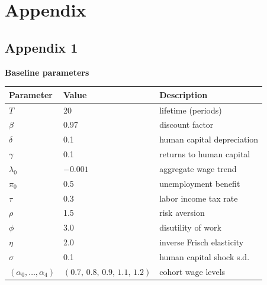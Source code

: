 \section{Appendix}

\subsection{Appendix 1}

\noindent\textbf{Baseline parameters}

\medskip
\begin{center}
\small
\begin{tabular}{llp{6.5cm}}
\toprule
Parameter & Value & Description \\
\midrule
$T$           & 20       & lifetime (periods) \\
$\beta$       & 0.97     & discount factor \\
$\delta$      & 0.1      & human capital depreciation \\
$\gamma$      & 0.1      & returns to human capital \\
$\lambda_0$   & $-0.001$ & aggregate wage trend \\
$\pi_0$       & 0.5      & unemployment benefit \\
$\tau$        & 0.3      & labor income tax rate \\
$\rho$        & 1.5      & risk aversion \\
$\phi$        & 3.0      & disutility of work \\
$\eta$        & 2.0      & inverse Frisch elasticity \\
$\sigma$      & 0.1      & human capital shock s.d. \\
$(\alpha_0,\ldots,\alpha_4)$ & $(0.7,\,0.8,\,0.9,\,1.1,\,1.2)$ & cohort wage levels \\
\bottomrule
\end{tabular}
\end{center}
